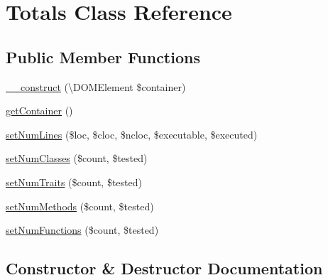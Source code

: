 \hypertarget{class_sebastian_bergmann_1_1_code_coverage_1_1_report_1_1_xml_1_1_totals}{}\section{Totals Class Reference}
\label{class_sebastian_bergmann_1_1_code_coverage_1_1_report_1_1_xml_1_1_totals}
\subsection*{Public Member Functions}
\begin{DoxyCompactItemize}
\item 
\mbox{\hyperlink{class_sebastian_bergmann_1_1_code_coverage_1_1_report_1_1_xml_1_1_totals_ac99ac955e4512cf6610aabbe1f149d73}{\+\_\+\+\_\+construct}} (\textbackslash{}D\+O\+M\+Element \$container)
\item 
\mbox{\hyperlink{class_sebastian_bergmann_1_1_code_coverage_1_1_report_1_1_xml_1_1_totals_a53e2ca32cf29808b0b18cd5accf3c4db}{get\+Container}} ()
\item 
\mbox{\hyperlink{class_sebastian_bergmann_1_1_code_coverage_1_1_report_1_1_xml_1_1_totals_a766e1d63b65140f2186ab18850a7f81d}{set\+Num\+Lines}} (\$loc, \$cloc, \$ncloc, \$executable, \$executed)
\item 
\mbox{\hyperlink{class_sebastian_bergmann_1_1_code_coverage_1_1_report_1_1_xml_1_1_totals_a35737a43de589613e2139f048a8915f7}{set\+Num\+Classes}} (\$count, \$tested)
\item 
\mbox{\hyperlink{class_sebastian_bergmann_1_1_code_coverage_1_1_report_1_1_xml_1_1_totals_a5d475991287d003bbdcfcbbde8ceb2e6}{set\+Num\+Traits}} (\$count, \$tested)
\item 
\mbox{\hyperlink{class_sebastian_bergmann_1_1_code_coverage_1_1_report_1_1_xml_1_1_totals_afa689cbb817ae194188dad6f30dd71cc}{set\+Num\+Methods}} (\$count, \$tested)
\item 
\mbox{\hyperlink{class_sebastian_bergmann_1_1_code_coverage_1_1_report_1_1_xml_1_1_totals_ac652a8181b4fc99b11bd8b7736a262fe}{set\+Num\+Functions}} (\$count, \$tested)
\end{DoxyCompactItemize}


\subsection{Constructor \& Destructor Documentation}
\mbox{\label{class_sebastian_bergmann_1_1_code_coverage_1_1_report_1_1_xml_1_1_totals_ac99ac955e4512cf6610aabbe1f149d73}} 
